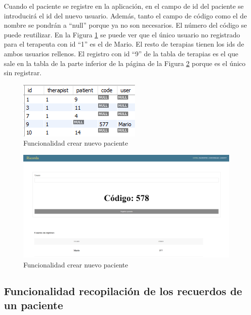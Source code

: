 Cuando el paciente se registre en la aplicación, en el campo de id del paciente se introducirá el id del nuevo usuario. Además, tanto el campo de código como el de nombre se pondrán a ``null'' porque ya no son necesarios. El número del código se puede reutilizar. En la Figura \ref{fig:funcionalidadnuevopacientetablaterapias} se puede ver que el único usuario no registrado para el terapeuta con id ``1'' es el de Mario. El resto de terapias tienen los ids de ambos usuarios rellenos. El registro con id ``9'' de la tabla de terapias es el que sale en la tabla de la parte inferior de la página de la Figura \ref{fig:funcionalidadnuevopaciente} porque es el único sin registrar.  
 
 \begin{figure}[h]
 	\centering
 	\includegraphics[scale=1.6]{Imagenes/Vectorial/funcionalidad_nuevo_paciente_tabla_terapias}
 	\caption{Funcionalidad crear nuevo paciente}
 	\label{fig:funcionalidadnuevopacientetablaterapias}
 \end{figure}

\begin{figure}[h]
	\centering
	\includegraphics[scale=0.3]{Imagenes/Vectorial/funcionalidad_nuevo_paciente}
	\caption{Funcionalidad crear nuevo paciente}
	\label{fig:funcionalidadnuevopaciente}
\end{figure}


\subsection{Funcionalidad recopilación de los recuerdos de un paciente}


